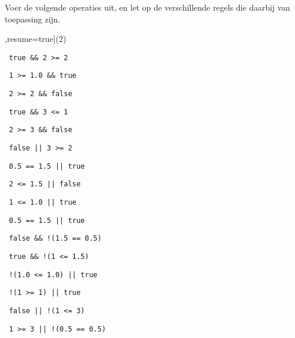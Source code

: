 \begin{exercise}
Voer de volgende operaties uit, en let op de verschillende regels die daarbij van toepassing zijn.

\begin{sltasks}[counter-format=2.tsk[1],resume=true](2)
  \task
  \begin{items}
    \item \texttt{ true \&\& 2 >= 2 }
    \item \texttt{ 1 >= 1.0 \&\& true }
    \item \texttt{ 2 >= 2 \&\& false }
    \item \texttt{ true \&\& 3 <= 1 }
    \item \texttt{ 2 >= 3 \&\& false }
  \end{items}
  \task
  \begin{items}
    \item \texttt{ false || 3 >= 2 }
    \item \texttt{ 0.5 == 1.5 || true }
    \item \texttt{ 2 <= 1.5 || false }
    \item \texttt{ 1 <= 1.0 || true }
    \item \texttt{ 0.5 == 1.5 || true }
  \end{items}
  \task
  \begin{items}
    \item \texttt{ false \&\& !(1.5 == 0.5) }
    \item \texttt{ true \&\& !(1 <= 1.5) }
    \item \texttt{ !(1.0 <= 1.0) || true }
    \item \texttt{ !(1 >= 1) || true }
    \item \texttt{ false || !(1 <= 3) }
  \end{items}
  \task
  \begin{items}
    \item \texttt{ 1 >= 3 || !(0.5 == 0.5) }

\end{items}
\end{sltasks}
\end{exercise}
